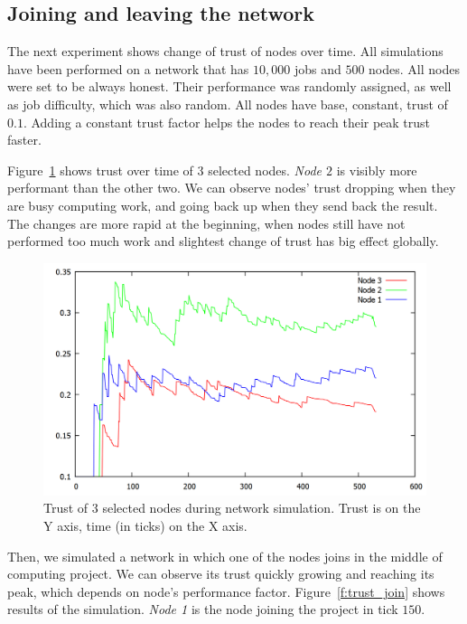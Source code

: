 \FloatBarrier

\subsection{Joining and leaving the network}

The next experiment shows change of trust of nodes over time. All simulations have been performed on a network that has $10,000$ jobs and $500$ nodes. All nodes were set to be always honest. Their performance was randomly assigned, as well as job difficulty, which was also random. All nodes have base, constant, trust of $0.1$. Adding a constant trust factor helps the nodes to reach their peak trust faster.

Figure~\ref{f:trust1} shows trust over time of $3$ selected nodes. \emph{Node $2$} is visibly more performant than the other two. We can observe nodes' trust dropping when they are busy computing work, and going back up when they send back the result. The changes are more rapid at the beginning, when nodes still have not performed too much work and slightest change of trust has big effect globally. 

\begin{figure}
\centering
\includegraphics[width=\textwidth]{diagrams/trust1.png}
\caption{Trust of 3 selected nodes during network simulation. Trust is on the Y axis, time (in ticks) on the X axis.}
\label{f:trust1}
\end{figure}

Then, we simulated a network in which one of the nodes joins in the middle of computing project. We can observe its trust quickly growing and reaching its peak, which depends on node's performance factor. Figure~\ref{f:trust_join} shows results of the simulation. \emph{Node 1} is the node joining the project in tick $150$. 

